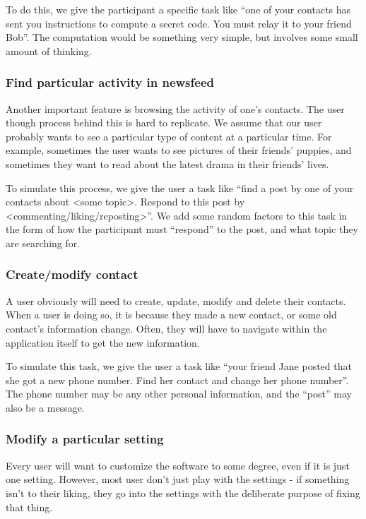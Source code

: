 \documentclass{sigchi}
\begin{document}
  To do this, we give the participant a specific task like ``one of your
  contacts has sent you instructions to compute a secret code. You must relay it
  to your friend Bob''. The computation would be something very simple, but
  involves some small amount of thinking. 

  \subsubsection{Find particular activity in newsfeed} 
  Another important feature is browsing the activity of one's contacts. The user
  though process behind this is hard to replicate. We assume that our user
  probably wants to see a particular type of content at a particular time.  For
  example, sometimes the user wants to see pictures of their friends' puppies,
  and sometimes they want to read about the latest drama in their friends'
  lives. 

  To simulate this process, we give the user a task like ``find a post by one of
  your contacts about <some topic>. Respond to this post by
  <commenting/liking/reposting>''. We add some random factors to this task in
  the form of how the participant must ``respond'' to the post, and what topic
  they are searching for. 

  \subsubsection{Create/modify contact} 
  A user obviously will need to create, update, modify and delete their
  contacts.  When a user is doing so, it is because they made a new contact, or
  some old contact's information change. Often, they will have to navigate
  within the application itself to get the new information.

  To simulate this task, we give the user a task like ``your friend Jane posted
  that she got a new phone number. Find her contact and change her phone
  number''. The phone number may be any other personal information, and the 
  ``post'' may also be a message. 

  \subsubsection{Modify a particular setting} 
  Every user will want to customize the software to some degree, even if it is
  just one setting. However, most user don't just play with the settings - if
  something isn't to their liking, they go into the settings with the deliberate 
  purpose of fixing that thing. 
\end{document}
